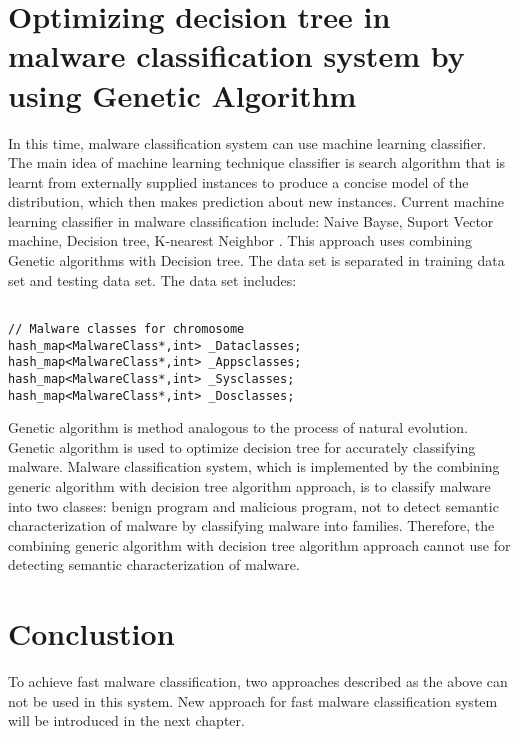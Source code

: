 \section{Optimizing decision tree in malware classification system by using Genetic Algorithm}
In this time, malware classification system can use machine learning classifier. The main idea of machine learning technique classifier is search algorithm that is learnt from externally supplied instances to produce a concise model of the distribution, which then  makes prediction about new  instances. Current machine learning classifier in malware classification include: Naive Bayse, Suport Vector machine, Decision tree, K-nearest Neighbor \cite{mohd}. This approach uses combining Genetic algorithms with Decision tree. The data set is separated in training data set and testing data set. The data set includes:
\begin{verbatim}

// Malware classes for chromosome
hash_map<MalwareClass*,int> _Dataclasses;
hash_map<MalwareClass*,int> _Appsclasses;
hash_map<MalwareClass*,int> _Sysclasses;
hash_map<MalwareClass*,int> _Dosclasses;

\end{verbatim}
Genetic algorithm is method analogous to the process of natural evolution. Genetic algorithm is used to optimize decision tree for accurately classifying malware. Malware classification system, which is implemented by the combining generic algorithm with decision tree algorithm approach, is to classify malware into two classes: benign program and malicious program, not to detect semantic characterization of malware by classifying malware into families. Therefore, the combining generic algorithm with decision tree algorithm approach cannot use for detecting semantic characterization of malware.
\section{Conclustion}
To achieve fast malware classification, two approaches described as the above can not be used in this system. New approach for fast malware classification system will be introduced in the next chapter. 